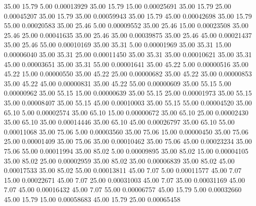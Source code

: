      35.00     15.79      5.00     0.00013929
     35.00     15.79     15.00     0.00025691
     35.00     15.79     25.00     0.00045207
     35.00     15.79     35.00     0.00059943
     35.00     15.79     45.00     0.00042698
     35.00     15.79     55.00     0.00020583
     35.00     25.46      5.00     0.00009552
     35.00     25.46     15.00     0.00023508
     35.00     25.46     25.00     0.00041635
     35.00     25.46     35.00     0.00039875
     35.00     25.46     45.00     0.00021437
     35.00     25.46     55.00     0.00010169
     35.00     35.31      5.00     0.00001969
     35.00     35.31     15.00     0.00006040
     35.00     35.31     25.00     0.00011450
     35.00     35.31     35.00     0.00010621
     35.00     35.31     45.00     0.00003651
     35.00     35.31     55.00     0.00001641
     35.00     45.22      5.00     0.00000516
     35.00     45.22     15.00     0.00000550
     35.00     45.22     25.00     0.00000682
     35.00     45.22     35.00     0.00000853
     35.00     45.22     45.00     0.00000831
     35.00     45.22     55.00     0.00000609
     35.00     55.15      5.00     0.00000962
     35.00     55.15     15.00     0.00000639
     35.00     55.15     25.00     0.00001973
     35.00     55.15     35.00     0.00008407
     35.00     55.15     45.00     0.00010003
     35.00     55.15     55.00     0.00004520
     35.00     65.10      5.00     0.00002574
     35.00     65.10     15.00     0.00000672
     35.00     65.10     25.00     0.00002430
     35.00     65.10     35.00     0.00014446
     35.00     65.10     45.00     0.00026797
     35.00     65.10     55.00     0.00011068
     35.00     75.06      5.00     0.00003560
     35.00     75.06     15.00     0.00000450
     35.00     75.06     25.00     0.00001409
     35.00     75.06     35.00     0.00010462
     35.00     75.06     45.00     0.00023234
     35.00     75.06     55.00     0.00011994
     35.00     85.02      5.00     0.00009895
     35.00     85.02     15.00     0.00004105
     35.00     85.02     25.00     0.00002959
     35.00     85.02     35.00     0.00006839
     35.00     85.02     45.00     0.00017533
     35.00     85.02     55.00     0.00013811
     45.00      7.07      5.00     0.00011577
     45.00      7.07     15.00     0.00022671
     45.00      7.07     25.00     0.00031003
     45.00      7.07     35.00     0.00031169
     45.00      7.07     45.00     0.00016432
     45.00      7.07     55.00     0.00006757
     45.00     15.79      5.00     0.00032660
     45.00     15.79     15.00     0.00058683
     45.00     15.79     25.00     0.00065458
